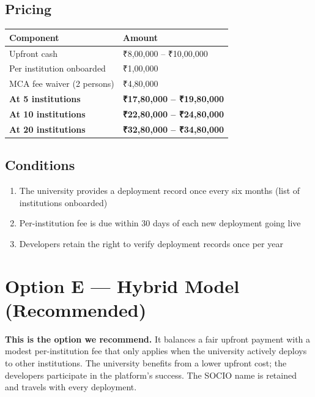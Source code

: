 \documentclass[12pt,a4paper]{article}
\begin{document}
\subsection*{Pricing}

\begin{tabularx}{\textwidth}{L{5cm} X}
\toprule
{}
\textbf{Component} & \textbf{Amount} \\
\midrule
Upfront cash & ₹8,00,000 – ₹10,00,000 \\
Per institution onboarded & ₹1,00,000 \\
MCA fee waiver (2 persons) & ₹4,80,000 \\
\textbf{At 5 institutions} & \textbf{₹17,80,000 – ₹19,80,000} \\
\textbf{At 10 institutions} & \textbf{₹22,80,000 – ₹24,80,000} \\
\textbf{At 20 institutions} & \textbf{₹32,80,000 – ₹34,80,000} \\
\bottomrule
\end{tabularx}

\subsection*{Conditions}
\begin{enumerate}[leftmargin=*, noitemsep]
    \item The university provides a deployment record once every six months (list of institutions onboarded)
    \item Per-institution fee is due within 30 days of each new deployment going live
    \item Developers retain the right to verify deployment records once per year
\end{enumerate}

\newpage
\section{Option E — Hybrid Model (Recommended)}

\begin{recommendbox}
\textbf{This is the option we recommend.} It balances a fair upfront payment with a modest per-institution fee that only applies when the university actively deploys to other institutions. The university benefits from a lower upfront cost; the developers participate in the platform's success. The SOCIO name is retained and travels with every deployment.
\end{recommendbox}
\end{document}
